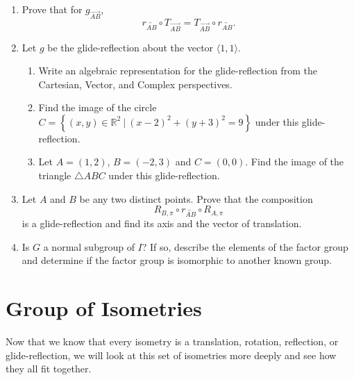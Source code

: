\documentclass[
]{book}
\providecommand{\tightlist}{%
  \setlength{\itemsep}{0pt}\setlength{\parskip}{0pt}}
\theoremstyle{definition}
\theoremstyle{definition}
\theoremstyle{definition}
\theoremstyle{definition}
\theoremstyle{remark}
\begin{document}
\begin{enumerate}
\def\labelenumi{\arabic{enumi}.}
\item
  Prove that for \(g_{\overrightarrow{AB}}\), \[r_{\overleftrightarrow{AB}}\circ T_{\overrightarrow{AB}} =  T_{\overrightarrow{AB}} \circ r_{\overleftrightarrow{AB}}.\]
\item
  Let \(g\) be the glide-reflection about the vector \(\langle 1,1\rangle\).

  \begin{enumerate}
  \def\labelenumii{\alph{enumii}.}
  \tightlist
  \item
    Write an algebraic representation for the glide-reflection from the Cartesian, Vector, and Complex perspectives.
  \item
    Find the image of the circle \(C=\left\{ (x,y)\in \mathbb{R}^2 \: \vert \: (x-2)^2+(y+3)^2 =9\right\}\) under this glide-reflection.
  \item
    Let \(A=(1,2)\), \(B=(-2,3)\) and \(C=(0,0)\). Find the image of the triangle \(\triangle ABC\) under this glide-reflection.
  \end{enumerate}
\item
  Let \(A\) and \(B\) be any two distinct points. Prove that the composition \[R_{B,\pi} \circ r_{\overleftrightarrow{AB}}\circ R_{A,\pi}\] is a glide-reflection and find its axis and the vector of translation.
\item
  Is \(G\) a normal subgroup of \(I\)? If so, describe the elements of the factor group and determine if the factor group is isomorphic to another known group.
\end{enumerate}

\hypertarget{group-of-isometries}{%
\section{Group of Isometries}\label{group-of-isometries}}

Now that we know that every isometry is a translation, rotation, reflection, or glide-reflection, we will look at this set of isometries more deeply and see how they all fit together.
\end{document}
